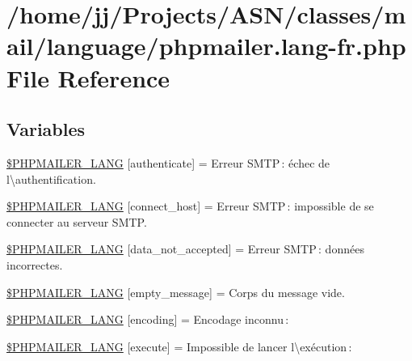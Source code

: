 \hypertarget{phpmailer_8lang-fr_8php}{}\section{/home/jj/\+Projects/\+A\+S\+N/classes/mail/language/phpmailer.lang-\/fr.php File Reference}
\label{phpmailer_8lang-fr_8php}
\subsection*{Variables}
\begin{DoxyCompactItemize}
\item 
\hyperlink{phpmailer_8lang-fr_8php_a2cb33073c989b85580748e331ed8b4aa}{\$\+P\+H\+P\+M\+A\+I\+L\+E\+R\+\_\+\+L\+A\+NG} \mbox{[}\textquotesingle{}authenticate\textquotesingle{}\mbox{]} = \textquotesingle{}Erreur S\+M\+T\+P \+: échec de l\textbackslash{}\textquotesingle{}authentification.\textquotesingle{}
\item 
\hyperlink{phpmailer_8lang-fr_8php_a2ee0cc637a06b96e45600db31c6799ee}{\$\+P\+H\+P\+M\+A\+I\+L\+E\+R\+\_\+\+L\+A\+NG} \mbox{[}\textquotesingle{}connect\+\_\+host\textquotesingle{}\mbox{]} = \textquotesingle{}Erreur S\+M\+T\+P \+: impossible de se connecter au serveur S\+M\+T\+P.\textquotesingle{}
\item 
\hyperlink{phpmailer_8lang-fr_8php_a814c6b191205d2361b3233e9c9d6fda5}{\$\+P\+H\+P\+M\+A\+I\+L\+E\+R\+\_\+\+L\+A\+NG} \mbox{[}\textquotesingle{}data\+\_\+not\+\_\+accepted\textquotesingle{}\mbox{]} = \textquotesingle{}Erreur S\+M\+T\+P \+: données incorrectes.\textquotesingle{}
\item 
\hyperlink{phpmailer_8lang-fr_8php_a33772099f637c9d6c2cd7425e0e37fed}{\$\+P\+H\+P\+M\+A\+I\+L\+E\+R\+\_\+\+L\+A\+NG} \mbox{[}\textquotesingle{}empty\+\_\+message\textquotesingle{}\mbox{]} = \textquotesingle{}Corps du message vide.\textquotesingle{}
\item 
\hyperlink{phpmailer_8lang-fr_8php_a817f7283f3d54c970a0c10305cc668cc}{\$\+P\+H\+P\+M\+A\+I\+L\+E\+R\+\_\+\+L\+A\+NG} \mbox{[}\textquotesingle{}encoding\textquotesingle{}\mbox{]} = \textquotesingle{}Encodage inconnu \+: \textquotesingle{}
\item 
\hyperlink{phpmailer_8lang-fr_8php_a668217a9563a168f30f2a8548b6ed5a9}{\$\+P\+H\+P\+M\+A\+I\+L\+E\+R\+\_\+\+L\+A\+NG} \mbox{[}\textquotesingle{}execute\textquotesingle{}\mbox{]} = \textquotesingle{}Impossible de lancer l\textbackslash{}\textquotesingle{}exécution \+: \textquotesingle{}

\end{DoxyCompactItemize}
